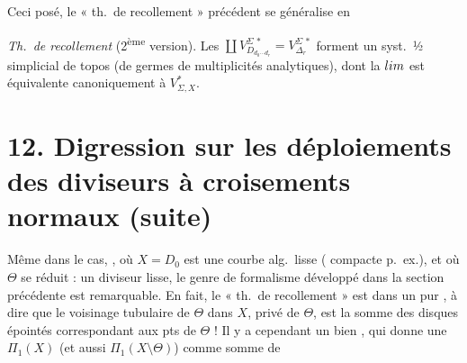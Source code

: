 \documentclass[11pt,a4paper]{article}
\begin{document}
Ceci posé, le « th.\ de recollement » précédent se généralise en

\emph{Th.\ de recollement} (2\textsuperscript{ème} version). Les $\coprod V^{\Sigma\,*}_{D_{d_0\cdots d_r}}=V^{\Sigma\,*}_{\Delta_r}$ forment un syst.\ ½ simplicial de topos (de germes de multiplicités analytiques), dont la $\varinjlim$ est équivalente canoniquement à $V^*_{\Sigma,X}$.

\section{12. Digression sur les déploiements des diviseurs à croisements normaux (suite)}


\struck{\ill{}} Même dans le cas,  , où $X=D_0$ est une courbe  alg.\ lisse (\struck{\ill{}} compacte p.~ex.), et où $\Theta$ se réduit : un diviseur lisse, le genre de formalisme développé dans la section précédente est remarquable. En fait, le « th.\ de recollement » est dans un pur , \struck{\ill{}}    à dire que le voisinage tubulaire de $\Theta$ dans $X$, privé de $\Theta$, est la somme des  disques épointés correspondant aux pts de $\Theta$ ! Il y a cependant un  bien , qui donne une  \struck{\ill{}} $\Pi_1(X)$ (et aussi $\Pi_1(X\setminus\Theta)$) comme somme  de


\end{document}
